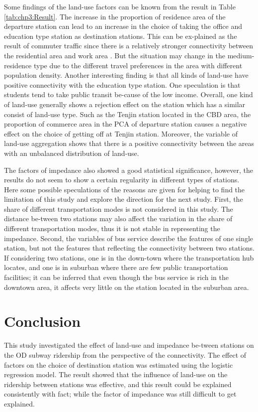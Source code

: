 %
Some findings of the land-use factors can be known from the result in Table \ref{tab:chp3:Result}. The increase in the proportion of residence area of the departure station can lead to an increase in the choice of taking the office and education type station as destination stations. This can be ex-plained as the result of commuter traffic since there is a relatively stronger connectivity between the residential area and work area \cite{badoe2000transportation}. But the situation may change in the medium-residence type due to the different travel preferences in the area with different population density. Another interesting finding is that all kinds of land-use have positive connectivity with the education type station. One speculation is that students tend to take public transit be-cause of the low income. Overall, one kind of land-use generally shows a rejection effect on the station which has a similar consist of land-use type. Such as the Tenjin station located in the CBD area, the proportion of commerce area in the PCA of departure station causes a negative effect on the choice of getting off at Tenjin station. Moreover, the variable of land-use aggregation shows that there is a positive connectivity between the areas with an unbalanced distribution of land-use.

%
The factors of impedance also showed a good statistical significance, however, the results do not seem to show a certain regularity in different types of stations. Here some possible speculations of the reasons are given for helping to find the limitation of this study and explore the direction for the next study. First, the share of different transportation modes is not considered in this study. The distance be-tween two stations may also affect the variation in the share of different transportation modes, thus it is not stable in representing the impedance.  Second, the variables of bus service describe the features of one single station, but not the features that reflecting the connectivity between two stations. If considering two stations, one is in the down-town where the transportation hub locates, and one is in suburban where there are few public transportation facilities; it can be inferred that even though the bus service is rich in the downtown area, it affects very little on the station located in the suburban area.

%
\section{Conclusion}
%
This study investigated the effect of land-use and impedance be-tween stations on the OD subway ridership from the perspective of the connectivity. The effect of factors on the choice of destination station was estimated using the logistic regression model. The result showed that the influence of land-use on the ridership between stations was effective, and this result could be explained consistently with fact; while the factor of impedance was still difficult to get explained.

